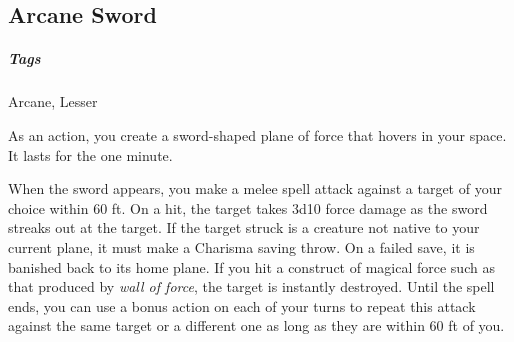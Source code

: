 


\subsection{Arcane Sword}

\subparagraph*{Tags} Arcane, Lesser

As an action, you create a sword-shaped plane of force that hovers in your space. It lasts for the one minute.

When the sword appears, you make a melee spell attack against a target of your choice within 60 ft. On a hit, the target takes 3d10 force damage as the sword streaks out at the target. If the target struck is a creature not native to your current plane, it must make a Charisma saving throw. On a failed save, it is banished back to its home plane. If you hit a construct of magical force such as that produced by \textit{wall of force}, the target is instantly destroyed. Until the spell ends, you can use a bonus action on each of your turns to repeat this attack against the same target or a different one as long as they are within 60 ft of you.










